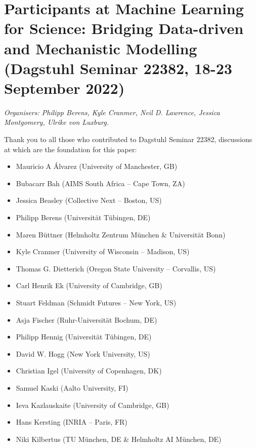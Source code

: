 \section{Participants at Machine Learning for Science: Bridging
Data-driven and Mechanistic Modelling (Dagstuhl Seminar 22382, 18-23
September
2022)}\label{annex-1-participants-at-machine-learning-for-science-bridging-data-driven-and-mechanistic-modelling-dagstuhl-seminar-22382-18-23-september-2022}

\emph{Organisers: Philipp Berens, Kyle Cranmer, Neil D. Lawrence, Jessica
Montgomery, Ulrike von Luxburg.}

Thank you to all those who contributed to Dagstuhl Seminar 22382,
discussions at which are the foundation for this paper:

\begin{itemize}
    \item 
    Mauricio A Álvarez (University of Manchester, GB)
    \item
    Bubacarr Bah (AIMS South Africa -- Cape Town, ZA)
    \item
    Jessica Beasley (Collective Next -- Boston, US)
    \item
    Philipp Berens (Universität Tübingen, DE)
    \item
    Maren Büttner (Helmholtz Zentrum München \& Universität Bonn)
    \item
    Kyle Cranmer (University of Wisconsin -- Madison, US)
    \item
    Thomas G. Dietterich (Oregon State University -- Corvallis, US)
    \item
    Carl Henrik Ek (University of Cambridge, GB)
    \item
    Stuart Feldman (Schmidt Futures -- New York, US)
    \item
    Asja Fischer (Ruhr-Universität Bochum, DE)
    \item
    Philipp Hennig (Universität Tübingen, DE)
    \item
    David W. Hogg (New York University, US)
    \item
    Christian Igel (University of Copenhagen, DK)
    \item
    Samuel Kaski (Aalto University, FI)
    \item
    Ieva Kazlauskaite (University of Cambridge, GB)
    \item
    Hans Kersting (INRIA -- Paris, FR)
    \item
    Niki Kilbertus (TU München, DE \& Helmholtz AI München, DE)

\end{itemize}
